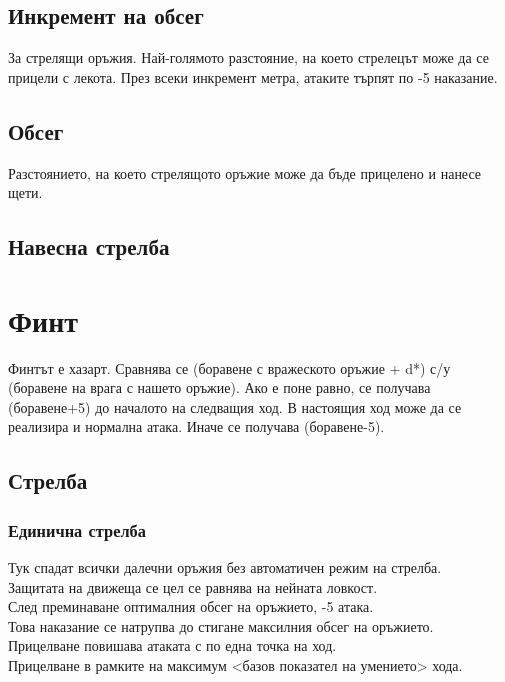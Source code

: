 



\subsection{Инкремент на обсег}
За стрелящи оръжия.
Най-голямото разстояние, на което стрелецът може да се прицели с лекота.
През всеки инкремент метра, атаките търпят по -5 наказание.


\subsection{Обсег}
Разстоянието, на което стрелящото оръжие може да бъде прицелено и нанесе щети.


\subsection{Навесна стрелба}


\section{Финт}
Финтът е хазарт.
Сравнява се (боравене с вражеското оръжие + d*) с/у (боравене на врага с нашето оръжие).
Ако е поне равно, се получава (боравене+5) до началото на следващия ход.
В настоящия ход може да се реализира и нормална атака.
Иначе се получава (боравене-5).


\subsection{Стрелба}
\subsubsection{Единична стрелба}
Тук спадат всички далечни оръжия без автоматичен режим на стрелба. \\
Защитата на движеща се цел се равнява на нейната ловкост.  \\
След преминаване оптималния обсег на оръжието, -5 атака.  \\
Това наказание се натрупва до стигане максилния обсег на оръжието.  \\
Прицелване повишава атаката с по една точка на ход.  \\
Прицелване в рамките на максимум <базов показател на умението> хода.
